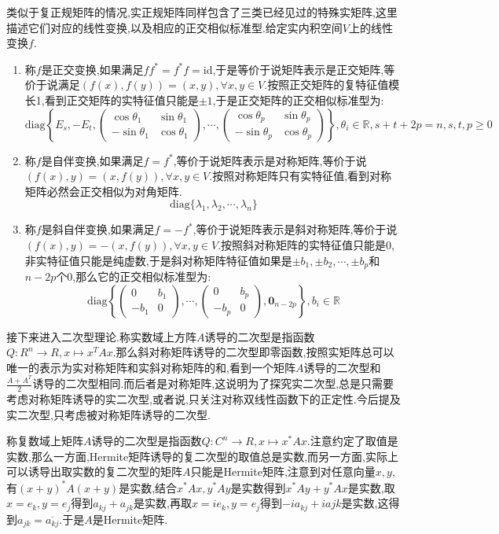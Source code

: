类似于复正规矩阵的情况,实正规矩阵同样包含了三类已经见过的特殊实矩阵,这里描述它们对应的线性变换,以及相应的正交相似标准型.给定实内积空间$V$上的线性变换$f$.
\begin{enumerate}
	\item 称$f$是正交变换,如果满足$ff^*=f^*f=\mathrm{id}$,于是等价于说矩阵表示是正交矩阵,等价于说满足$(f(x),f(y))=(x,y),\forall x,y\in V$.按照正交矩阵的复特征值模长1,看到正交矩阵的实特征值只能是$\pm1$,于是正交矩阵的正交相似标准型为:
	$$\mathrm{diag}\left\{E_s,-E_t,\left(\begin{array}{cc}
	\cos\theta_1&\sin\theta_1\\
	-\sin\theta_1&\cos\theta_1\end{array}\right),\cdots,\left(\begin{array}{cc}
	\cos\theta_p&\sin\theta_p\\
	-\sin\theta_p&\cos\theta_p\end{array}\right)\right\},\theta_i\in \mathbb{R},s+t+2p=n,s,t,p\ge0$$
	\item 称$f$是自伴变换,如果满足$f=f^*$,等价于说矩阵表示是对称矩阵,等价于说$(f(x),y)=(x,f(y)),\forall x,y\in V$.按照对称矩阵只有实特征值,看到对称矩阵必然会正交相似为对角矩阵.
	$$\mathrm{diag}\{\lambda_1,\lambda_2,\cdots,\lambda_n\}$$
	\item 称$f$是斜自伴变换,如果满足$f=-f^*$,等价于说矩阵表示是斜对称矩阵,等价于说$(f(x),y)=-(x,f(y)),\forall x,y\in V$.按照斜对称矩阵的实特征值只能是0,非实特征值只能是纯虚数,于是斜对称矩阵特征值如果是$\pm b_1,\pm b_2,\cdots,\pm b_p$和$n-2p$个0,那么它的正交相似标准型为:
	$$\mathrm{diag}\left\{\left(\begin{array}{cc}
	0&b_1\\
	-b_1&0\end{array}\right),\cdots,\left(\begin{array}{cc}
	0&b_p\\
	-b_p&0\end{array}\right),\textbf{0}_{n-2p}\right\},b_i\in \mathbb{R}$$
\end{enumerate}

接下来进入二次型理论.称实数域上方阵$A$诱导的二次型是指函数$Q:R^n\to R,x\mapsto x^TAx$.那么斜对称矩阵诱导的二次型即零函数,按照实矩阵总可以唯一的表示为实对称矩阵和实斜对称矩阵的和,看到一个矩阵$A$诱导的二次型和$\frac{A+A^T}{2}$诱导的二次型相同.而后者是对称矩阵,这说明为了探究实二次型,总是只需要考虑对称矩阵诱导的实二次型,或者说,只关注对称双线性函数下的正定性.今后提及实二次型,只考虑被对称矩阵诱导的二次型.

称复数域上矩阵$A$诱导的二次型是指函数$Q:C^n\to R,x\mapsto x^*Ax$.注意约定了取值是实数,那么一方面,Hermite矩阵诱导的复二次型的取值总是实数,而另一方面,实际上可以诱导出取实数的复二次型的矩阵$A$只能是Hermite矩阵,注意到对任意向量$x,y$,有$(x+y)^*A(x+y)$是实数,结合$x^*Ax,y^*Ay$是实数得到$x^*Ay+y^*Ax$是实数,取$x=e_k,y=e_j$得到$a_{kj}+a_{jk}$是实数,再取$x=ie_k,y=e_j$得到$-ia_{kj}+ia{jk}$是实数,这得到$a_ {jk}=\overline{a_{kj}}$.于是$A$是Hermite矩阵.

